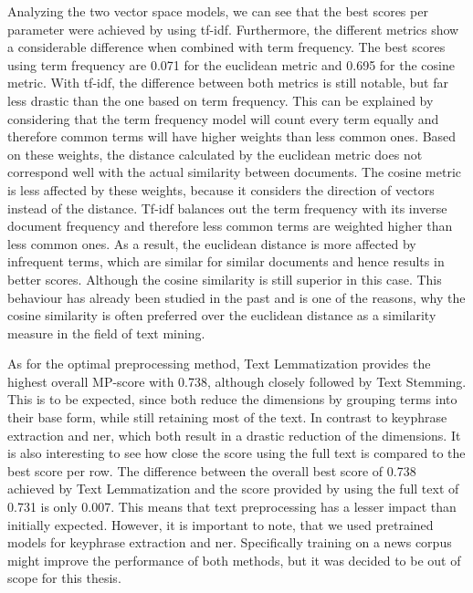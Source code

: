 Analyzing the two vector space models, we can see that the best scores per parameter were achieved by using tf-idf.
Furthermore, the different metrics show a considerable difference when combined with term frequency.
The best scores using term frequency are 0.071 for the euclidean metric and 0.695 for the cosine metric.
With tf-idf, the difference between both metrics is still notable, but far less drastic than the one based on term frequency.
This can be explained by considering that the term frequency model will count every term equally
and therefore common terms will have higher weights than less common ones.
Based on these weights, the distance calculated by the euclidean metric does not correspond well
with the actual similarity between documents.
The cosine metric is less affected by these weights,
because it considers the direction of vectors instead of the distance.
Tf-idf balances out the term frequency with its inverse document frequency
and therefore less common terms are weighted higher than less common ones.
As a result, the euclidean distance is more affected by infrequent terms,
which are similar for similar documents and hence results in better scores.
Although the cosine similarity is still superior in this case.
This behaviour has already been studied in the past\cite{Strehl00impactof, similarity_measures}
and is one of the reasons, why the cosine similarity is often preferred over the euclidean distance
as a similarity measure in the field of text mining.

As for the optimal preprocessing method, Text Lemmatization provides the highest overall MP-score with 0.738,
although closely followed by Text Stemming.
This is to be expected, since both reduce the dimensions
by grouping terms into their base form, while still retaining most of the text.
In contrast to keyphrase extraction and \Gls{ner}, which both result in a drastic reduction of the dimensions.
It is also interesting to see how close the score using the full text is compared to the best score per row.
The difference between the overall best score of 0.738 achieved by Text Lemmatization
and the score provided by using the full text of 0.731 is only 0.007.
This means that text preprocessing has a lesser impact than initially expected.
However, it is important to note, that we used pretrained models for keyphrase extraction and \Gls{ner}.
Specifically training on a news corpus might improve the performance of both methods,
but it was decided to be out of scope for this thesis.

